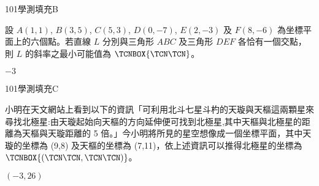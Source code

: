     \begin{QUESTION}
        \begin{ExamInfo}{101}{學測}{填充}{B}
        \end{ExamInfo}
        \begin{ExamAnsRateInfo}{39}{71}{39}{7}
        \end{ExamAnsRateInfo}
        \begin{QBODY}
            設 $A(1,1)$, $B(3,5)$, $C(5,3)$, $D(0,-7)$, $E(2,-3)$ 及 $F(8,-6)$ 為坐標平面上的六個點。若直線 $L$ 分別與三角形 $ABC$ 及三角形 $DEF$ 各恰有一個交點，則 $L$ 的斜率之最小可能值為 $\TCNBOX{\TCN\TCN}$。
        \end{QBODY}
        \begin{QFROMS}
        \end{QFROMS}
        \begin{QTAGS}\end{QTAGS}
        \begin{QANS}
            $-3$
        \end{QANS}
        \begin{QSOLLIST}
        \end{QSOLLIST}
        \begin{QEMPTYSPACE}
        \end{QEMPTYSPACE}
    \end{QUESTION}
    \begin{QUESTION}
        \begin{ExamInfo}{101}{學測}{填充}{C}
        \end{ExamInfo}
        \begin{ExamAnsRateInfo}{56}{90}{65}{13}
        \end{ExamAnsRateInfo}
        \begin{QBODY}
            小明在天文網站上看到以下的資訊「可利用北斗七星斗杓的天璇與天樞這兩顆星來尋找北極星:由天璇起始向天樞的方向延伸便可找到北極星,其中天樞與北極星的距離為天樞與天璇距離的 5 倍。」今小明將所見的星空想像成一個坐標平面，其中天璇的坐標為 (9,8) 及天樞的坐標為 (7,11)，依上述資訊可以推得北極星的坐標為 $\TCNBOX{(\TCN\TCN,\TCN\TCN)}$。
        \end{QBODY}
        \begin{QFROMS}
        \end{QFROMS}
        \begin{QTAGS}\end{QTAGS}
        \begin{QANS}
            $(-3,26)$
        \end{QANS}
        \begin{QSOLLIST}
        \end{QSOLLIST}
        \begin{QEMPTYSPACE}
        \end{QEMPTYSPACE}
    \end{QUESTION}
